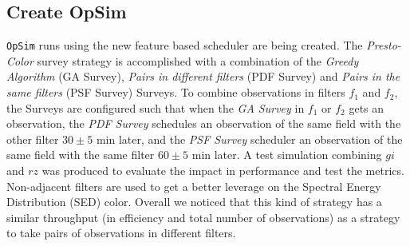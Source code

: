 \documentclass[12pt, letterpaper]{article}
\begin{document}
\subsection{Create OpSim}

{\tt OpSim} runs using the new feature based scheduler are being created. The {\em Presto-Color} survey strategy is accomplished with a combination of the {\it Greedy Algorithm} (GA Survey), {\it Pairs in different filters} (PDF Survey) and {\it Pairs in the same filters} (PSF Survey) Surveys. To combine observations in filters $f_1$ and $f_2$, the Surveys are configured such that when the {\it GA Survey} in $f_1$ or $f_2$ gets an observation, the {\it PDF Survey} schedules an observation of the same field with the other filter $30 \pm 5$ min later, and the {\it PSF Survey} scheduler an observation of the same field with the same filter $60 \pm 5$ min later. A test simulation combining $gi$ and $rz$ was produced to evaluate the impact in performance and test the metrics. Non-adjacent filters are used to get a better leverage on the Spectral Energy Distribution (SED) color. Overall we noticed that this kind of strategy has a similar throughput (in efficiency and total number of observations) as a strategy to take pairs of observations in different filters. 

\end{document}
